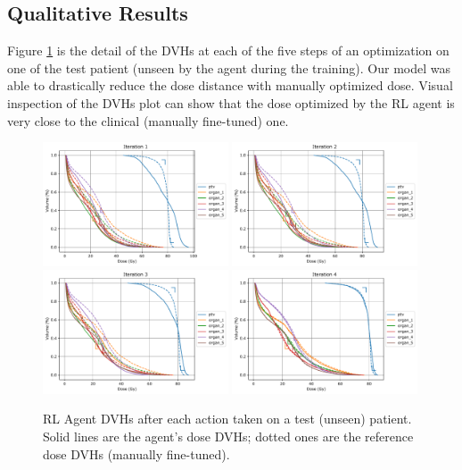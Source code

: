 \subsection{Qualitative Results}
Figure \ref{fig:steps} is the detail of the DVHs at each of the five steps of an optimization on one of the test patient (unseen by the agent during the training).
Our model was able to drastically reduce the dose distance with manually optimized dose.
Visual inspection of the DVHs plot can show that the dose optimized by the RL agent is very close to the clinical (manually fine-tuned) one.

\begin{figure}
	\centering
	\includegraphics[width=0.49\textwidth]{steps/distance-test-w1.pdf}	\includegraphics[width=0.49\textwidth]{steps/distance-test-w2.pdf}	\includegraphics[width=0.49\textwidth]{steps/distance-test-w3.pdf}	\includegraphics[width=0.49\textwidth]{steps/distance-test-w4.pdf}
	\caption{RL Agent DVHs after each action taken on a test (unseen) patient. Solid lines are the agent's dose DVHs; dotted ones are the reference dose DVHs (manually fine-tuned).}
	\label{fig:steps}
\end{figure}

